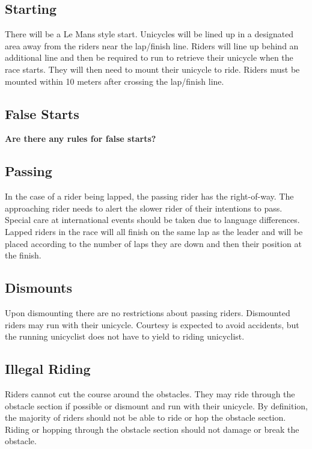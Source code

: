\subsection{Starting}

There will be a Le Mans style start.
Unicycles will be lined up in a designated area away from the riders near the lap/finish line.
Riders will line up behind an additional line and then be required to run to retrieve their unicycle when the race starts.
They will then need to mount their unicycle to ride.
Riders must be mounted within 10 meters after crossing the lap/finish line.

\subsection{False Starts}

\textbf{Are there any rules for false starts?}

\subsection{Passing}

In the case of a rider being lapped, the passing rider has the right-of-way.
The approaching rider needs to alert the slower rider of their intentions to pass.
Special care at international events should be taken due to language differences.
Lapped riders in the race will all finish on the same lap as the leader and will be placed according to the number of laps they are down and then their position at the finish.

\subsection{Dismounts}

Upon dismounting there are no restrictions about passing riders.
Dismounted riders may run with their unicycle.
Courtesy is expected to avoid accidents, but the running unicyclist does not have to yield to riding unicyclist.

\subsection{Illegal Riding}

Riders cannot cut the course around the obstacles.
They may ride through the obstacle section if possible or dismount and run with their unicycle.
By definition, the majority of riders should not be able to ride or hop the obstacle section.
Riding or hopping through the obstacle section should not damage or break the obstacle.

